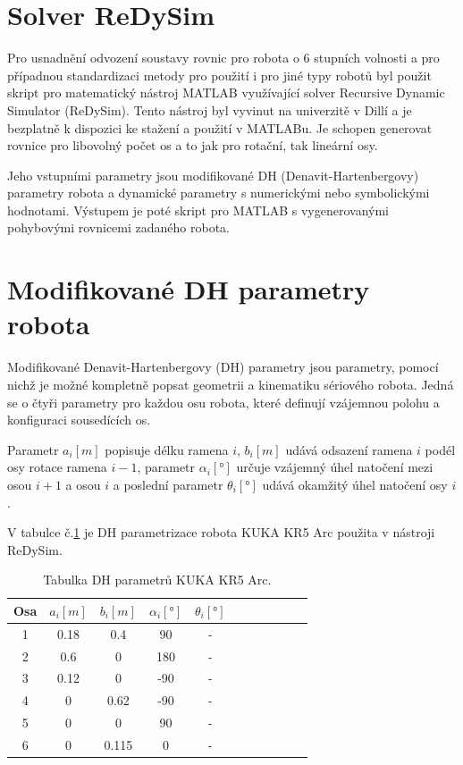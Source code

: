 \section{Solver ReDySim}

Pro usnadnění odvození soustavy rovnic pro robota o 6 stupních volnosti a pro případnou standardizaci metody pro použití i pro jiné typy robotů byl použit skript pro matematický nástroj MATLAB využívající solver Recursive Dynamic Simulator (ReDySim)\cite{redysim}. Tento nástroj byl vyvinut na univerzitě v Dillí a je bezplatně k dispozici ke stažení a použití v MATLABu. Je schopen generovat rovnice pro libovolný počet os a to jak pro rotační, tak lineární osy. 

Jeho vstupními parametry jsou modifikované DH (Denavit-Hartenbergovy) parametry robota a dynamické parametry s numerickými nebo symbolickými hodnotami. Výstupem je poté skript pro MATLAB s vygenerovanými pohybovými rovnicemi zadaného robota.  

\section{Modifikované DH parametry robota}

Modifikované Denavit-Hartenbergovy (DH) parametry jsou parametry, pomocí nichž je možné kompletně popsat geometrii a kinematiku sériového robota. Jedná se o čtyři parametry pro každou osu robota, které definují vzájemnou polohu a konfiguraci sousedících os. 

Parametr $a_i [m]$ popisuje délku ramena $i$, $b_i [m]$ udává odsazení ramena $i$ podél osy rotace ramena $i-1$, parametr $\alpha_i [\si{\degree}]$ určuje vzájemný úhel natočení mezi osou $i+1$ a osou $i$ a poslední parametr $\theta_i [\si{\degree}]$ udává okamžitý úhel natočení osy $i$.

V tabulce č.\ref{tab_DH_kuka} je DH parametrizace robota KUKA KR5 Arc použita v nástroji ReDySim.

\begin{table}[htbp]
  \centering
  \caption{Tabulka DH parametrů KUKA KR5 Arc.}
    \begin{tabular}{c|cccccccccc}
    \multicolumn{1}{c|}{Osa} & \multicolumn{1}{c}{$a_{i} [m]$} & \multicolumn{1}{c}{$b_{i} [m]$} & \multicolumn{1}{c}{$\alpha_{i} [\si{\degree}]$} & \multicolumn{1}{c}{$\theta_i [\si{\degree}]$} \\
    \hline
    1     &   0.18  &  0.4   &  90     &   -    &  \\
    2     &   0.6   &  0     &  180    &   -    &  \\
    3     &   0.12  &  0     &  -90    &   -    &  \\
    4     &   0     &  0.62  &  -90    &   -    &  \\
    5     &   0     &  0     &  90     &   -    &  \\
    6     &   0     &  0.115 &  0      &   -    &  \\
    \end{tabular}%
  \label{tab_DH_kuka}%
\end{table}%

